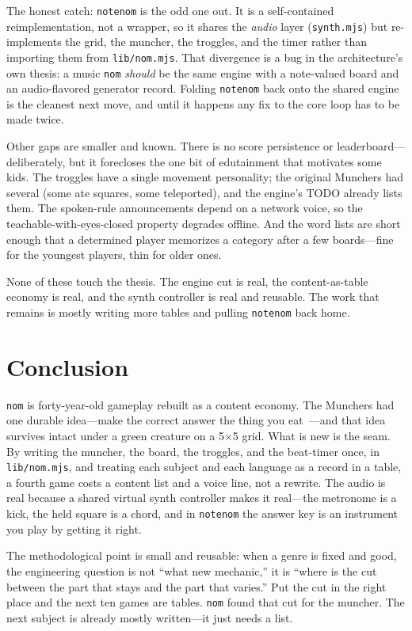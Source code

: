 \documentclass[10pt,letterpaper,twocolumn]{article}
\begin{document}
The honest catch: \texttt{notenom} is the odd one out. It is a self-contained reimplementation, not a wrapper, so it shares the \emph{audio} layer (\texttt{synth.mjs}) but re-implements the grid, the muncher, the troggles, and the timer rather than importing them from \texttt{lib/nom.mjs}. That divergence is a bug in the architecture's own thesis: a music \texttt{nom} \emph{should} be the same engine with a note-valued board and an audio-flavored generator record. Folding \texttt{notenom} back onto the shared engine is the cleanest next move, and until it happens any fix to the core loop has to be made twice.

Other gaps are smaller and known. There is no score persistence or leaderboard---deliberately, but it forecloses the one bit of edutainment that motivates some kids. The troggles have a single movement personality; the original Munchers had several (some ate squares, some teleported), and the engine's TODO already lists them. The spoken-rule announcements depend on a network voice, so the teachable-with-eyes-closed property degrades offline. And the word lists are short enough that a determined player memorizes a category after a few boards---fine for the youngest players, thin for older ones.

None of these touch the thesis. The engine cut is real, the content-as-table economy is real, and the synth controller is real and reusable. The work that remains is mostly writing more tables and pulling \texttt{notenom} back home.

\section{Conclusion}

\texttt{nom} is forty-year-old gameplay rebuilt as a content economy. The Munchers had one durable idea---make the correct answer the thing you eat~\citep{habgood2011motivating}---and that idea survives intact under a green creature on a 5$\times$5 grid. What is new is the seam. By writing the muncher, the board, the troggles, and the beat-timer once, in \texttt{lib/nom.mjs}, and treating each subject and each language as a record in a table, a fourth game costs a content list and a voice line, not a rewrite. The audio is real because a shared virtual synth controller makes it real---the metronome is a kick, the held square is a chord, and in \texttt{notenom} the answer key is an instrument you play by getting it right.

The methodological point is small and reusable: when a genre is fixed and good, the engineering question is not ``what new mechanic,'' it is ``where is the cut between the part that stays and the part that varies.'' Put the cut in the right place and the next ten games are tables. \texttt{nom} found that cut for the muncher. The next subject is already mostly written---it just needs a list.



\end{document}
